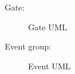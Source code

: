 Gate:

\begin{figure}[h]
	\caption{\label{fig:subcaption_example}Gate UML}
\end{figure}

Event group:

\begin{figure}[h]
	\caption{\label{fig:subcaption_example}Event UML}
\end{figure}


